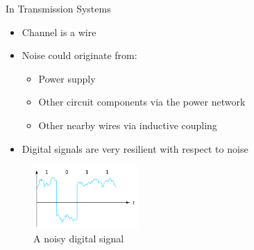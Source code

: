\documentclass[aspectratio=169,hyperref={pdfpagelabels=false}]{beamer}
\begin{document}
\begin{frame}{In Transmission Systems}
    \begin{multicols*}{2}
        \begin{itemize}
            \item Channel is a wire
            \item Noise could originate from:
            \begin{itemize}
                \item Power supply
                \item Other circuit components via the power network
                \item Other nearby wires via inductive coupling
            \end{itemize}
            \item Digital signals are very resilient with respect to noise
        \end{itemize}

        \begin{figure}
            
            \includegraphics[width=4cm]{fig/Digital-signal-noise.png}
            \caption{A noisy digital signal\footnotemark}
        \end{figure}
    \end{multicols*}

  
\end{frame}
\end{document}
